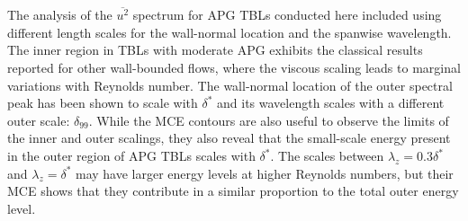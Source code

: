 
The analysis of the $\overline{u^2}$ spectrum for APG TBLs conducted here included using different length scales for the wall-normal location and the spanwise wavelength.
The inner region in TBLs with moderate APG exhibits the classical results reported for other wall-bounded flows, where the viscous scaling leads to marginal variations with Reynolds number.
The wall-normal location of the outer spectral peak has been shown to scale with $\delta^*$ and its wavelength scales with a different outer scale: $\delta_{99}$. 
While the MCE contours are also useful to observe the limits of the inner and outer scalings, they also reveal that the small-scale energy present in the outer region of APG TBLs scales with $\delta^*$. The scales between $\lambda_z=0.3\delta^*$ and $\lambda_z=\delta^*$ may have larger energy levels at higher Reynolds numbers, but their MCE shows that they contribute in a similar proportion to the total outer energy level.